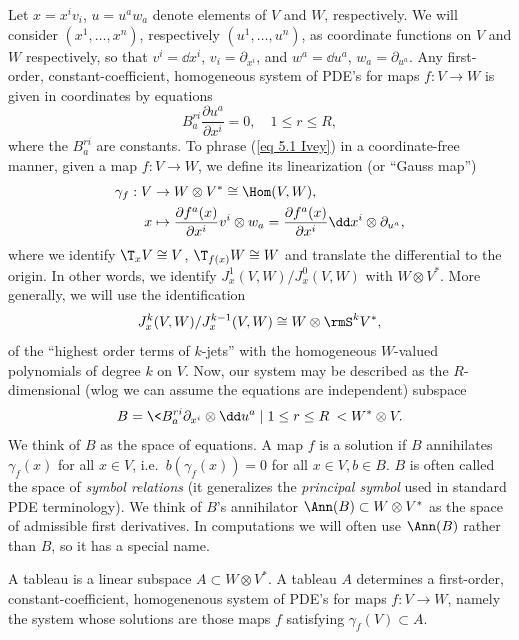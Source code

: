 Let $x=x^iv_i$, $u=u^aw_a$ denote elements of $V$ and $W$, respectively. We will consider $(x^1,\ldots,x^n)$, respectively $(u^1,\ldots,u^n)$, as coordinate functions on $V$ and $W$ respectively, so that $v^i=\dd x^i$, $v_i=\partial_{x^i}$, and $w^a=\dd u^a$, $w_a=\partial_{u^a}$. Any first-order, constant-coefficient, homogeneous system of PDE's for maps $f:V\to W$ is given in coordinates by equations
\[B_a^{ri}\frac{\partial u^a}{\partial x^i}=0,\quad 1\leq r\leq R,\label{eq 5.1 Ivey}\]
where the $B_a^{ri}$ are constants. 
To phrase (\ref{eq 5.1 Ivey}) in a coordinate-free manner, given a map $f:V\to W$, we define its linearization (or ``Gauss map'')
\begin{align}
    \gamma_f:V &\to W\otimes V^\ast\cong \Hom(V,W),\\
    x&\mapsto \frac{\partial f^a(x)}{\partial x^i}v^i\otimes w_a=\frac{\partial f^a(x)}{\partial x^i} \dd x^i\otimes \partial_{u^a},
\end{align}
where we identify $\T_xV\cong V$, $\T_{f(x)}W\cong W$ and translate the differential to the origin. In other words, we identify $J^1_x(V,W)\slash J^0_x(V,W)$ with $W\otimes V^\ast$. More generally, we will use the identification
\[J^k_x(V,W)\slash J^{k-1}_x(V,W)\cong W\otimes \rmS^k V^\ast,\]
of the ``highest order terms of $k$-jets'' with the homogeneous $W$-valued polynomials of degree $k$ on $V$. Now, our system may be described as the $R$-dimensional (\gls{wlog} we can assume the equations are independent) subspace
\[B=\<B_a^{ri}\partial_{x^i}\otimes\dd u^a\mid 1\leq r\leq R\> < W^\ast\otimes V.\]
We think of $B$ as the space of equations. A map $f$ is a solution if $B$ annihilates $\gamma_f(x)$ for all $x\in V$, i.e.\ $b(\gamma_f(x))=0$ for all $x\in V,b\in B$.
$B$ is often called the space of \emph{symbol relations} (it generalizes the \emph{principal symbol} used in standard PDE terminology). We think of $B$'s annihilator $\Ann(B)\subset W\otimes V^\ast$ as the space of admissible first derivatives. In computations we will often use $\Ann(B)$ rather than $B$, so it has a special name.

\begin{defn}[Tableau]
    A tableau is a linear subspace $A\subset W\otimes V^\ast$. A tableau $A$ determines a first-order, constant-coefficient, homogenenous system of PDE's for maps $f:V\to W$, namely the system whose solutions are those maps $f$ satisfying $\gamma_f(V)\subset A$.
\end{defn}

